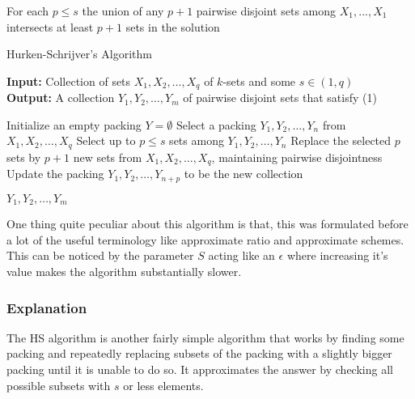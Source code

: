 \begin{idea}
    For each $p\leq s$ the union of any $p+1$ pairwise disjoint sets among $X_1,...,X_1$ intersects at least $p+1$ sets in the solution
\end{idea}

\begin{algorithm}
\caption{Hurken-Schrijver's Algorithm}
\label{alg:heuristic_packing}
 \textbf{Input:} Collection of sets \( X_1, X_2, \dots, X_q \) of \( k \)-sets and some $s\in (1,q)$\\
 \textbf{Output:} A collection \( Y_1, Y_2, \dots, Y_m \) of pairwise disjoint sets that satisfy (1)
\begin{algorithmic}[1]


\STATE Initialize an empty packing \( Y = \emptyset \)
    \STATE Select a packing \( Y_1, Y_2, \dots, Y_n \) from \( X_1, X_2, \dots, X_q \)
    \STATE Select up to \( p \leq s \) sets among \( Y_1, Y_2, \dots, Y_n \)
    \STATE Replace the selected \( p \) sets by \( p+1 \) new sets from \( X_1, X_2, \dots, X_q \), maintaining pairwise disjointness
    \STATE Update the packing \( Y_1, Y_2, \dots, Y_{n+p} \) to be the new collection
\ENDWHILE

\RETURN \( Y_1, Y_2, \dots, Y_m \)
\end{algorithmic}
\end{algorithm}

\noindent One thing quite peculiar about this algorithm is that, this was formulated before a lot of the useful terminology like approximate ratio and approximate schemes. This can be noticed by the parameter $S$ acting like an $\epsilon$ where increasing it's value makes the algorithm substantially slower. 

\subsubsection*{Explanation}
The HS algorithm is another fairly simple algorithm that works by 
finding some packing and 
repeatedly replacing subsets of the packing with a slightly bigger packing until it is unable to do so. It approximates the answer by checking all possible subsets with $s$ or less elements. 
